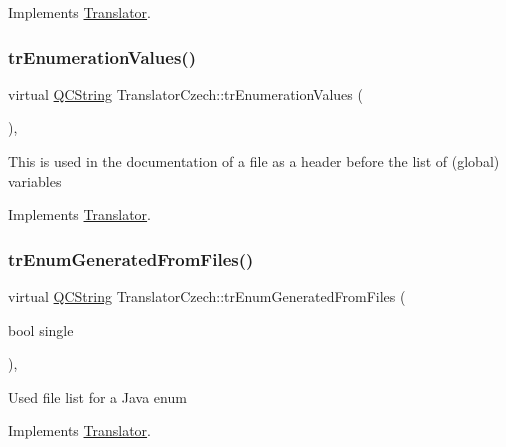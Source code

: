 Implements \mbox{\hyperlink{class_translator}{Translator}}.

\mbox{\label{class_translator_czech_a4c92b0c310494cfc0f82a3e8a37576d3}} 
\subsubsection{\texorpdfstring{trEnumerationValues()}{trEnumerationValues()}}
{\footnotesize\ttfamily virtual \mbox{\hyperlink{class_q_c_string}{Q\+C\+String}} Translator\+Czech\+::tr\+Enumeration\+Values (\begin{DoxyParamCaption}{ }\end{DoxyParamCaption})\hspace{0.3cm}{\ttfamily [inline]}, {\ttfamily [virtual]}}

This is used in the documentation of a file as a header before the list of (global) variables 

Implements \mbox{\hyperlink{class_translator}{Translator}}.

\mbox{\label{class_translator_czech_abf472af923eb272404b3b67ff6f4e764}} 
\subsubsection{\texorpdfstring{trEnumGeneratedFromFiles()}{trEnumGeneratedFromFiles()}}
{\footnotesize\ttfamily virtual \mbox{\hyperlink{class_q_c_string}{Q\+C\+String}} Translator\+Czech\+::tr\+Enum\+Generated\+From\+Files (\begin{DoxyParamCaption}\item[{bool}]{single }\end{DoxyParamCaption})\hspace{0.3cm}{\ttfamily [inline]}, {\ttfamily [virtual]}}

Used file list for a Java enum 

Implements \mbox{\hyperlink{class_translator}{Translator}}.

\mbox{\label{class_translator_czech_a3ec3a74a7487ff628edc604a2176517d}} 
